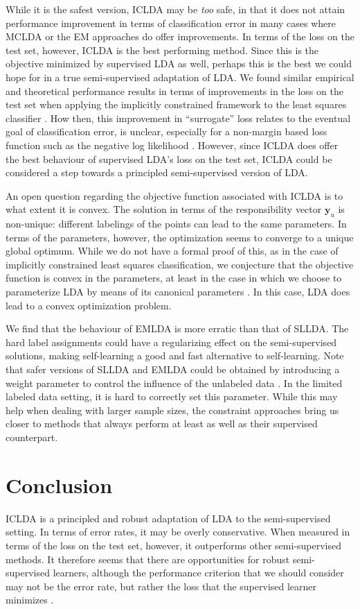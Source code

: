While it is the safest version, ICLDA may be \emph{too} safe, in that it does not attain performance improvement in terms of classification error in many cases where MCLDA or the EM approaches do offer improvements. In terms of the loss on the test set, however, ICLDA is the best performing method. Since this is the objective minimized by supervised LDA as well, perhaps this is the best we could hope for in a true semi-supervised adaptation of LDA. We found similar empirical and theoretical performance results in terms of improvements in the loss on the test set when applying the implicitly constrained framework to the least squares classifier \cite{Krijthe2015}. How then, this improvement in ``surrogate'' loss relates to the eventual goal of classification error, is unclear, especially for a non-margin based loss function such as the negative log likelihood \cite{Bartlett2006}. However, since ICLDA does offer the best behaviour of supervised LDA's loss on the test set, ICLDA could be considered a step towards a principled semi-supervised version of LDA.

An open question regarding the objective function associated with ICLDA is to what extent it is convex. The solution in terms of the responsibility vector $\mathbf{y}_u$ is non-unique: different labelings of the points can lead to the same parameters. In terms of the parameters, however, the optimization seems to converge to a unique global optimum. While we do not have a formal proof of this, as in the case of implicitly constrained least squares classification, we conjecture that the objective function is convex in the parameters, at least in the case in which we choose to parameterize LDA by means of its canonical parameters \cite{Lehmann1998}.  In this case, LDA does lead to a convex optimization problem.

We find that the behaviour of EMLDA is more erratic than that of SLLDA. The hard label assignments could have a regularizing effect on the semi-supervised solutions, making self-learning a good and fast alternative to self-learning. Note that safer versions of SLLDA and EMLDA could be obtained by introducing a weight parameter to control the influence of the unlabeled data \cite{McLachlan1975}. In the limited labeled data setting, it is hard to correctly set this parameter. While this may help when dealing with larger sample sizes, the constraint approaches bring us closer to methods that always perform at least as well as their supervised counterpart. 

\section{Conclusion}
ICLDA is a principled and robust adaptation of LDA to the semi-supervised setting. In terms of error rates, it may be overly conservative. When measured in terms of the loss on the test set, however, it outperforms other semi-supervised methods. It therefore seems that there are opportunities for robust semi-supervised learners, although the performance criterion that we should consider may not be the error rate, but rather the loss that the supervised learner minimizes \cite{Loog2014b}.

